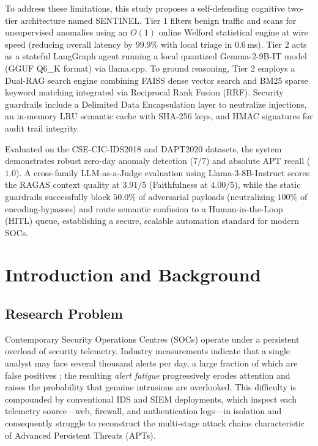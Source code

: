 \documentclass[12pt,a4paper]{article}
\begin{document}
To address these limitations, this study proposes a self-defending cognitive two-tier architecture named SENTINEL. Tier 1 filters benign traffic and scans for unsupervised anomalies using an $O(1)$ online Welford statistical engine at wire speed (reducing overall latency by $99.9\%$ with local triage in $0.6$\,ms). Tier 2 acts as a stateful LangGraph agent running a local quantized Gemma-2-9B-IT model (GGUF Q6\_K format) via llama.cpp. To ground reasoning, Tier 2 employs a Dual-RAG search engine combining FAISS dense vector search and BM25 sparse keyword matching integrated via Reciprocal Rank Fusion (RRF). Security guardrails include a Delimited Data Encapsulation layer to neutralize injections, an in-memory LRU semantic cache with SHA-256 keys, and HMAC signatures for audit trail integrity.

Evaluated on the CSE-CIC-IDS2018 and DAPT2020 datasets, the system demonstrates robust zero-day anomaly detection ($7/7$) and absolute APT recall ($1.0$). A cross-family LLM-as-a-Judge evaluation using Llama-3-8B-Instruct scores the RAGAS context quality at $3.91/5$ (Faithfulness at $4.00/5$), while the static guardrails successfully block $50.0\%$ of adversarial payloads (neutralizing $100\%$ of encoding-bypasses) and route semantic confusion to a Human-in-the-Loop (HITL) queue, establishing a secure, scalable automation standard for modern SOCs.

\newpage
\tableofcontents

\newpage
\section{Introduction and Background}

\subsection{Research Problem}
Contemporary Security Operations Centres (SOCs) operate under a persistent overload of security telemetry. Industry measurements indicate that a single analyst may face several thousand alerts per day, a large fraction of which are false positives \cite{ponemon2023}; the resulting \textit{alert fatigue} progressively erodes attention and raises the probability that genuine intrusions are overlooked. This difficulty is compounded by conventional IDS and SIEM deployments, which inspect each telemetry source---web, firewall, and authentication logs---in isolation and consequently struggle to reconstruct the multi-stage attack chains characteristic of Advanced Persistent Threats (APTs).
\end{document}
